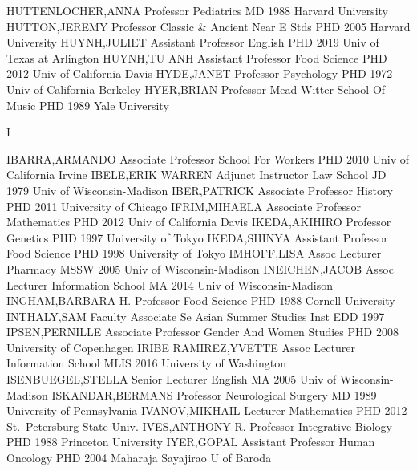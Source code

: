 \documentclass[
]{article}
\begin{document}
\textbar{}  \textbar HUTTENLOCHER,ANNA \textbar Professor
\textbar Pediatrics \textbar MD 1988 Harvard University \textbar{}
 \textbar HUTTON,JEREMY \textbar Professor \textbar Classic
\& Ancient Near E Stds \textbar PHD 2005 Harvard University \textbar{}
 \textbar HUYNH,JULIET \textbar Assistant Professor
\textbar English \textbar PHD 2019 Univ of Texas at Arlington \textbar{}
 \textbar HUYNH,TU ANH \textbar Assistant Professor
\textbar Food Science \textbar PHD 2012 Univ of California Davis
\textbar{}  \textbar HYDE,JANET \textbar Professor
\textbar Psychology \textbar PHD 1972 Univ of California Berkeley
\textbar{}  \textbar HYER,BRIAN \textbar Professor
\textbar Mead Witter School Of Music \textbar PHD 1989 Yale University
\textbar{}  \textbar{}

I

\textbar{}

IBARRA,ARMANDO \textbar Associate Professor \textbar School For Workers
\textbar{}  \textbar PHD 2010 Univ of California Irvine
\textbar IBELE,ERIK WARREN \textbar Adjunct Instructor \textbar Law
School \textbar{}  \textbar JD 1979 Univ of
Wisconsin-Madison \textbar IBER,PATRICK \textbar Associate Professor
\textbar History \textbar{}  \textbar PHD 2011 University of
Chicago \textbar IFRIM,MIHAELA \textbar Associate Professor
\textbar Mathematics \textbar{}  \textbar PHD 2012 Univ of
California Davis \textbar IKEDA,AKIHIRO \textbar Professor
\textbar Genetics \textbar{}  \textbar PHD 1997 University
of Tokyo \textbar IKEDA,SHINYA \textbar Assistant Professor
\textbar Food Science \textbar{}  \textbar PHD 1998
University of Tokyo \textbar IMHOFF,LISA \textbar Assoc Lecturer
\textbar Pharmacy \textbar{}  \textbar MSSW 2005 Univ of
Wisconsin-Madison \textbar INEICHEN,JACOB \textbar Assoc Lecturer
\textbar Information School \textbar{}  \textbar MA 2014
Univ of Wisconsin-Madison \textbar INGHAM,BARBARA H. \textbar Professor
\textbar Food Science \textbar{}  \textbar PHD 1988 Cornell
University \textbar INTHALY,SAM \textbar Faculty Associate \textbar Se
Asian Summer Studies Inst \textbar{}  \textbar EDD 1997
\textbar IPSEN,PERNILLE \textbar Associate Professor \textbar Gender And
Women Studies \textbar{}  \textbar PHD 2008 University of
Copenhagen \textbar IRIBE RAMIREZ,YVETTE \textbar Assoc Lecturer
\textbar Information School \textbar{}  \textbar MLIS 2016
University of Washington \textbar ISENBUEGEL,STELLA \textbar Senior
Lecturer \textbar English \textbar{}  \textbar MA 2005 Univ
of Wisconsin-Madison \textbar ISKANDAR,BERMANS \textbar Professor
\textbar Neurological Surgery \textbar{}  \textbar MD 1989
University of Pennsylvania \textbar IVANOV,MIKHAIL \textbar Lecturer
\textbar Mathematics \textbar{}  \textbar PHD 2012
St.~Petersburg State Univ. \textbar IVES,ANTHONY R. \textbar Professor
\textbar Integrative Biology \textbar{}  \textbar PHD 1988
Princeton University \textbar IYER,GOPAL \textbar Assistant Professor
\textbar Human Oncology \textbar{}  \textbar PHD 2004
Maharaja Sayajirao U of Baroda \textbar{}
\end{document}

